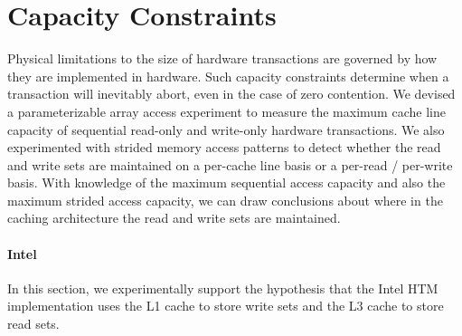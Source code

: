\section{Capacity Constraints}
\label{sec:capacity}
Physical limitations to the size of hardware 
transactions are
governed by how they are implemented in hardware. 
Such capacity constraints
determine when a transaction will inevitably abort, 
even in the case of zero contention. We 
devised a parameterizable array access
experiment to measure the maximum cache line capacity 
of sequential read-only and write-only
hardware transactions. We also experimented with strided 
memory access patterns
to detect whether the read and write sets are maintained
on a per-cache line basis or a per-read / per-write basis.
With knowledge of the maximum sequential access 
capacity and also the maximum
strided access capacity, we can draw conclusions 
about where in the caching
architecture the read and write sets are 
maintained. 

\paragraph{Intel}

In this section, we experimentally support the hypothesis
that the Intel HTM implementation uses the L1 cache to 
store write sets and the L3 cache to store read sets.

